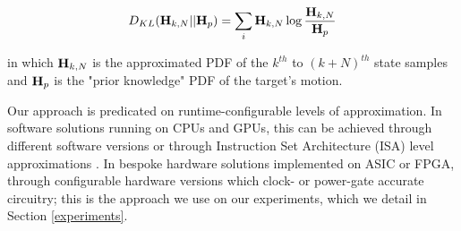 \begin{equation}
D_{KL}({\bf H}_{k, N} || {\bf H}_{p}) = \sum_{i}{{\bf H}_{k, N}} \log{\frac{{\bf H}_{k, N}}{{\bf H}_{p}}}
\label{eq:KLDIV1}
\end{equation}

\noindent in which ${\bf H}_{k, N}$ is the approximated PDF of the $k^{th}$ to $(k+N)^{th}$ state samples and ${\bf H}_{p}$ is the "prior knowledge" PDF of the target's motion.

\par Our approach is predicated on runtime-configurable levels of approximation. In software solutions running on CPUs and GPUs, this can be achieved through different software versions \cite{vassiliadis2015programming} or through Instruction Set Architecture (ISA) level approximations \cite{venkataramani2013quality}. In bespoke hardware solutions implemented on ASIC or FPGA, through configurable hardware versions which clock- or power-gate accurate circuitry; this is the approach we use on our experiments, which we detail in Section \ref{experiments}.


